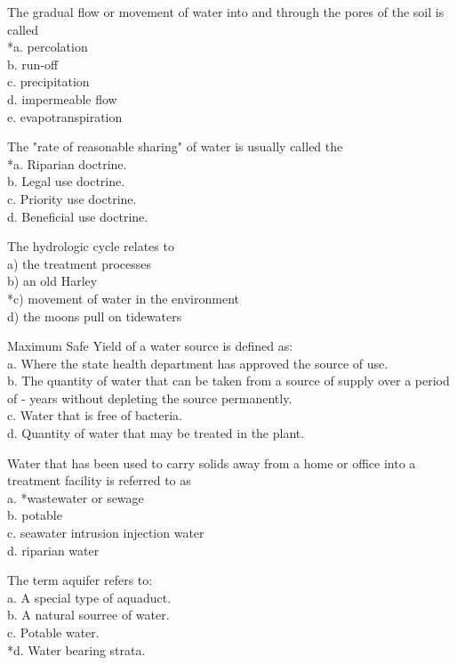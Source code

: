   \item The gradual flow or movement of water into and through the pores of the soil is called\\
*a. percolation\\
b. run-off\\
c. precipitation\\
d. impermeable flow\\
e. evapotranspiration\\

  \item The "rate of reasonable sharing" of water is usually called the\\
*a. Riparian doctrine.\\
b. Legal use doctrine.\\
c. Priority use doctrine.\\
d. Beneficial use doctrine.\\

 \item The hydrologic cycle relates to\\
a) the treatment processes\\
b) an old Harley\\
*c) movement of water in the environment\\
d) the moons pull on tidewaters\\

 \item Maximum Safe Yield of a water source is defined as:\\
a. Where the state health department has approved the source of use.\\

b. The quantity of water that can be taken from a source of supply over a period of - years without depleting the source permanently.\\
c. Water that is free of bacteria.\\
d. Quantity of water that may be treated in the plant.
 \item Water that has been used to carry solids away from a home or office into a treatment facility is referred to as\\
a. *wastewater or sewage\\
b. potable\\
c. seawater intrusion injection water\\
d. riparian water\\

  \item The term aquifer refers to:\\
a. A special type of aquaduct.\\
b. A natural sourree of water.\\
c. Potable water.\\
*d.  Water bearing strata.\\

